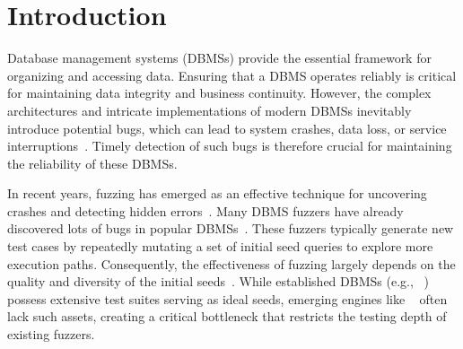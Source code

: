 \documentclass[sigconf,review,anonymous]{acmart}
\begin{document}

\maketitle
\section{Introduction}

Database management systems (DBMSs) provide the essential framework for organizing and accessing data.
Ensuring that a DBMS operates reliably is critical for maintaining data integrity and business continuity.
However, the complex architectures and intricate implementations of modern DBMSs inevitably introduce potential bugs, which can lead to system crashes, data loss, or service interruptions~\cite{pgbugs, mysqlbugs}.
Timely detection of such bugs is therefore crucial for maintaining the reliability of these DBMSs.

In recent years, fuzzing has emerged as an effective technique for uncovering crashes and detecting hidden errors~\cite{afl, libfuzzer, aflpp, pafl}. 
Many DBMS fuzzers have already discovered lots of bugs in popular DBMSs~\cite{sqlsmithbug, DBbugs, sqlsmith}. 
These fuzzers typically generate new test cases by repeatedly mutating a set of initial seed queries to explore more execution paths. Consequently, the effectiveness of fuzzing largely depends on the quality and diversity of the initial seeds~\cite{fu2022griffin, liang2023sequence, jiang2023dynsql, zhong2020squirrel}.
While established DBMSs (e.g., \pg{}~\cite{pg_git}) possess extensive test suites serving as ideal seeds, emerging engines like \duckdb{}~\cite{duckdb_git} often lack such assets, creating a critical bottleneck that restricts the testing depth of existing fuzzers.


\end{document}

